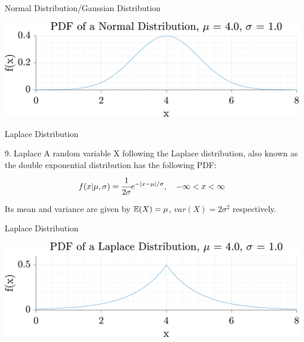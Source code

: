 \documentclass[aspectratio=169,xcolor=dvipsnames,svgnames,x11names,fleqn]{beamer}
\begin{document}
    
    \begin{frame}[allowframebreaks]{Normal Distribution/Gaussian Distribution}

             \begin{center}
    \includegraphics[width=.9\textwidth]{figures/Normal.pdf}
    \end{center}
    
    
    \end{frame}
    
    
    \begin{frame}[allowframebreaks]{Laplace Distribution}
        \begin{tblock}{9. Laplace}
            A random variable X following the Laplace distribution, also known as the double exponential distribution has the following PDF:
        \begin{equation}
            f(x|\mu, \sigma) = \cfrac{1}{2\sigma}e^{-|x-\mu|/\sigma}, \quad -\infty < x < \infty
        \end{equation}
    
        Its mean and variance are given by ${\mathbb E}(X) = \mu$, $var(X) = 2\sigma^2$ respectively.
        
        \end{tblock}
        \end{frame}
    
    
    \begin{frame}[allowframebreaks]{Laplace Distribution}
      \begin{center}
    \includegraphics[width=.9\textwidth]{figures/Laplace.pdf}
    \end{center}
        
    \end{frame}
    
\end{document}
